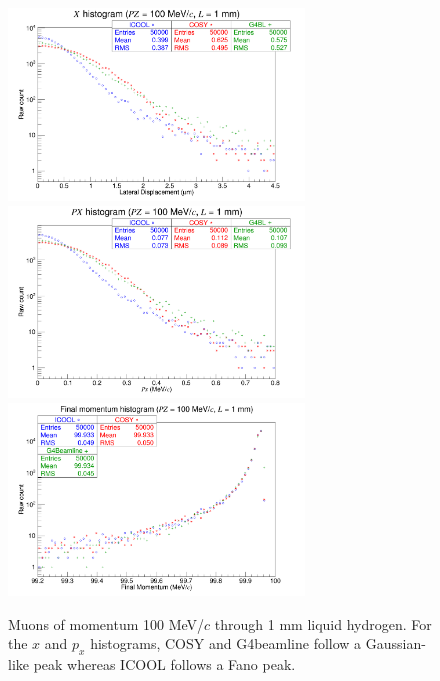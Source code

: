 \begin{figure}[H]
  \centering
    \includegraphics[width=0.7\textwidth]{Benchmarking/LH/X.100.1.png} 
    \includegraphics[width=0.7\textwidth]{Benchmarking/LH/PX.100.1.png} 
    \includegraphics[width=0.7\textwidth]{Benchmarking/LH/strag.100.1.png} 
  \caption[Muons of momentum 100 MeV/$c$ through 1 mm liquid hydrogen.]{Muons of momentum 100 MeV/$c$ through 1 mm liquid hydrogen. For the $x$ and $p_x$ histograms, COSY and G4beamline follow a Gaussian-like peak whereas ICOOL follows a Fano peak.}
  \label{fig:100.1}
\end{figure}

